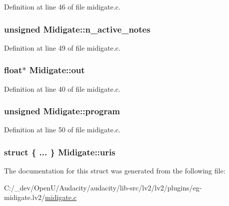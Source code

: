 Definition at line 46 of file midigate.\+c.

\subsubsection[{\texorpdfstring{n\+\_\+active\+\_\+notes}{n_active_notes}}]{\setlength{\rightskip}{0pt plus 5cm}unsigned Midigate\+::n\+\_\+active\+\_\+notes}\hypertarget{struct_midigate_accba6d19a58619d3d17d0255a374fcbc}{}\label{struct_midigate_accba6d19a58619d3d17d0255a374fcbc}


Definition at line 49 of file midigate.\+c.

\subsubsection[{\texorpdfstring{out}{out}}]{\setlength{\rightskip}{0pt plus 5cm}float$\ast$ Midigate\+::out}\hypertarget{struct_midigate_a63f302c6e89baac690e7b0b41101bf92}{}\label{struct_midigate_a63f302c6e89baac690e7b0b41101bf92}


Definition at line 40 of file midigate.\+c.

\subsubsection[{\texorpdfstring{program}{program}}]{\setlength{\rightskip}{0pt plus 5cm}unsigned Midigate\+::program}\hypertarget{struct_midigate_ad140aebedaeebbfbe99d58fe994394d1}{}\label{struct_midigate_ad140aebedaeebbfbe99d58fe994394d1}


Definition at line 50 of file midigate.\+c.

\subsubsection[{\texorpdfstring{uris}{uris}}]{\setlength{\rightskip}{0pt plus 5cm}struct \{ ... \}   Midigate\+::uris}\hypertarget{struct_midigate_aa00b90d0d71556c90937b3c1b16192a0}{}\label{struct_midigate_aa00b90d0d71556c90937b3c1b16192a0}


The documentation for this struct was generated from the following file\+:\begin{DoxyCompactItemize}
\item 
C\+:/\+\_\+dev/\+Open\+U/\+Audacity/audacity/lib-\/src/lv2/lv2/plugins/eg-\/midigate.\+lv2/\hyperlink{midigate_8c}{midigate.\+c}\end{DoxyCompactItemize}
